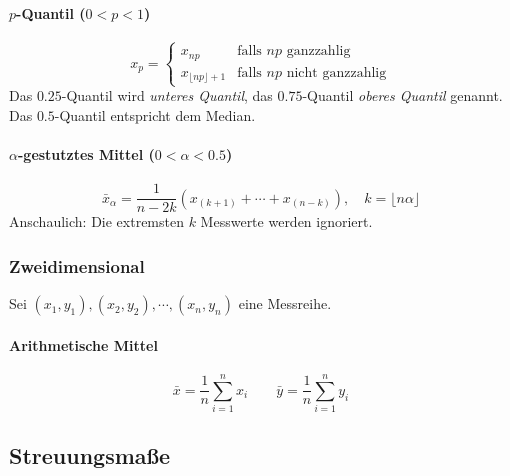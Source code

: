                 \paragraph{\(p\)-Quantil (\(0 < p < 1\))}
                \begin{equation*}
	                x_p =
	                \begin{cases}
	                	x_{np}                     & \textrm{falls } np \textrm{ ganzzahlig}       \\
	                	x_{\lfloor np \rfloor + 1} & \textrm{falls } np \textrm{ nicht ganzzahlig}
	                \end{cases}
                \end{equation*}
                Das \(0.25\)-Quantil wird \textit{unteres Quantil}, das \(0.75\)-Quantil \textit{oberes Quantil} genannt. Das \(0.5\)-Quantil entspricht dem Median.
                
                \paragraph{\(\alpha\)-gestutztes Mittel (\(0 < \alpha < 0.5\))}
                \begin{equation*}
	                \bar{x}_\alpha = \frac{1}{n - 2k} (x_{(k+1)} + \cdots + x_{(n-k)}), \quad k = \lfloor n\alpha \rfloor
                \end{equation*}
                Anschaulich: Die extremsten \(k\) Messwerte werden ignoriert.

            \subsubsection{Zweidimensional}
                Sei \( (x_1, y_1), (x_2, y_2), \cdots, (x_n, y_n) \) eine Messreihe.
                
                \paragraph{Arithmetische Mittel}
                \begin{equation*}
                    \bar{x} = \frac{1}{n} \sum_{i = 1}^{n} x_i \qquad \bar{y} = \frac{1}{n} \sum_{i = 1}^{n} y_i
                \end{equation*}

        \subsection{Streuungsmaße}
